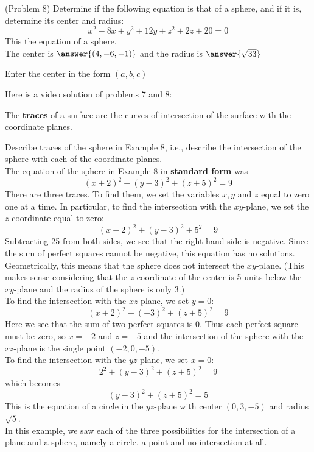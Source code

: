 \documentclass[handout]{ximera}
\begin{document}
\begin{problem}(Problem 8)
Determine if the following equation is that of a sphere, and if it is, determine its center and radius:
\[
x^2 -8x + y^2 + 12y + z^2 + 2z + 20 = 0
\]
This  the equation of a sphere.\\
The center is $\answer{(4,-6,-1)}$ and the radius is $\answer{\sqrt{33}}$
\begin{hint}
Enter the center in the form $(a, b, c)$
\end{hint}
\end{problem}

Here is a video solution of problems 7 and 8:\\
\begin{foldable}
\end{foldable}

The {\bf traces} of a surface are the curves of intersection of the surface with the coordinate planes.
\begin{example}[Example 9]
Describe traces of the sphere in Example 8, i.e., describe the intersection of the sphere with each of the coordinate planes.\\
The equation of the sphere in Example 8 in {\bf standard form} was
\[
(x+2)^2 +(y-3)^2 + (z+5)^2 = 9
\]
There are three traces. To find them, we set the variables $x, y$ and $z$ equal to zero one at a time.
In particular, to find the intersection with the $xy$-plane, we set the $z$-coordinate equal to zero:
\[
(x+2)^2 +(y-3)^2 + 5^2 = 9
\]
Subtracting 25 from both sides, we see that the right hand side is negative.  
Since the sum of perfect squares cannot be negative, this equation has no solutions.
Geometrically, this means that the sphere does not intersect the $xy$-plane. 
(This makes sense considering that the $z$-coordinate of the center is 5 units 
below the $xy$-plane and the radius of the sphere is only 3.)\\
To find the intersection with the $xz$-plane, we set $y = 0$:
\[
(x+2)^2 + (-3)^2 + (z+5)^2 = 9
\]
Here we see that the sum of two perfect squares is 0.  Thus each perfect square must be zero, so $x = -2$ and $z = -5$ and 
the intersection of the sphere with the $xz$-plane is the single point $(-2, 0, -5)$.\\
To find the intersection with the $yz$-plane, we set $x = 0$:
\[
2^2 + (y-3)^2 + (z+5)^2 = 9
\]
which becomes
\[
(y-3)^2 + (z+5)^2 = 5
\]
This is the equation of a circle in the $yz$-plane with center $(0, 3, -5)$ and radius $\sqrt 5$.\\
In this example, we saw each of the three possibilities for the intersection of a 
plane and a sphere, namely a circle, a point and no intersection at all.
\end{example}
\end{document}
